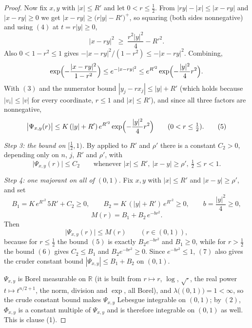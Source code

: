\begin{proof}
Now fix $x,y$ with $|x| \leq R'$ and let $0 < r \leq \tfrac12$.  From
$|ry| - |x| \leq |x-ry|$ and $|x-ry| \geq 0$ we get
$|x-ry| \geq \bigl(r|y| - R'\bigr)^+$, so squaring (both sides nonnegative) and using
$(4)$ at $t = r|y| \geq 0$,
\[
  |x-ry|^2 \;\geq\; \frac{r^2|y|^2}{4} - R'^2 .
\]
Also $0 < 1-r^2 \leq 1$ gives $-|x-ry|^2/(1-r^2) \leq -|x-ry|^2$.  Combining,
\[
  \exp\Bigl(-\frac{|x-ry|^2}{1-r^2}\Bigr) \leq e^{-|x-ry|^2}
    \leq e^{R'^2}\exp\Bigl(-\frac{|y|^2}{4}r^2\Bigr) .
\]
With $(3)$ and the numerator bound $|y_j-rx_j| \leq |y| + R'$ (which holds because
$|v_i| \leq |v|$ for every coordinate, $r \leq 1$ and $|x| \leq R'$), and since all three
factors are nonnegative,
\begin{equation*}
  \bigl|\Psi_{x,y}(r)\bigr|
    \leq K\,(|y|+R')\,e^{R'^2}\exp\Bigl(-\frac{|y|^2}{4}r^2\Bigr)
  \qquad (0 < r \leq \tfrac12) . \tag{5}
\end{equation*}

\emph{Step 3: the bound on $[\tfrac12,1)$.}
By  applied to $R'$ and $\rho'$ there is a
constant $C_2 > 0$, depending only on $n$, $j$, $R'$ and $\rho'$, with
\begin{equation*}
  \bigl|\Psi_{x,y}(r)\bigr| \leq C_2
  \qquad\text{whenever } |x| \leq R',\ |x-y| \geq \rho',\ \tfrac12 \leq r < 1 . \tag{6}
\end{equation*}

\emph{Step 4: one majorant on all of $(0,1)$.}
Fix $x,y$ with $|x| \leq R'$ and $|x-y| \geq \rho'$, and set
\[
  B_1 = K\,e^{R'^2}\,5R' + C_2 \geq 0 , \qquad
  B_2 = K\,(|y|+R')\,e^{R'^2} \geq 0 , \qquad
  b = \frac{|y|^2}{4} \geq 0 ,
\]
\[
  M(r) = B_1 + B_2\,e^{-br^2} .
\]
Then
\begin{equation*}
  \bigl|\Psi_{x,y}(r)\bigr| \leq M(r) \qquad (r \in (0,1)) , \tag{7}
\end{equation*}
because for $r \leq \tfrac12$ the bound $(5)$ is exactly $B_2e^{-br^2}$ and $B_1 \geq 0$,
while for $r > \tfrac12$ the bound $(6)$ gives $C_2 \leq B_1$ and $B_2e^{-br^2} \geq 0$.
Since $e^{-br^2} \leq 1$, $(7)$ also gives the cruder constant bound
$|\Psi_{x,y}| \leq B_1+B_2$ on $(0,1)$.

$\Psi_{x,y}$ is Borel measurable on $\mathbb{R}$ (it is built from $r \mapsto r$,
$\log$, $\sqrt\cdot$, the real power $t \mapsto t^{n/2+1}$, the norm, division and
$\exp$, all Borel), and $\lambda\bigl((0,1)\bigr) = 1 < \infty$, so the crude constant
bound makes $\Psi_{x,y}$ Lebesgue integrable on $(0,1)$; by $(2)$, $\Phi_{x,y}$ is a
constant multiple of $\Psi_{x,y}$ and is therefore integrable on $(0,1)$ as well.  This
is clause (1).


\end{proof}
